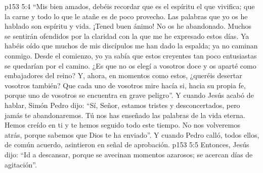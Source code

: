 \vs p153 5:4 “Mis bien amados, debéis recordar que es el espíritu el que vivifica; que la carne y todo lo que le atañe es de poco provecho. Las palabras que yo os he hablado son espíritu y vida. ¡Tened buen ánimo! No os he abandonado. Muchos se sentirán ofendidos por la claridad con la que me he expresado estos días. Ya habéis oído que muchos de mis discípulos me han dado la espalda; ya no caminan conmigo. Desde el comienzo, yo ya sabía que estos creyentes tan poco entusiastas se quedarían por el camino. ¿Es que no os elegí a vosotros doce y os aparté como embajadores del reino? Y, ahora, en momentos como estos, ¿queréis desertar vosotros también? Que cada uno de vosotros mire hacía si, hacia su propia fe, porque uno de vosotros se encuentra en grave peligro”. Y cuando Jesús acabó de hablar, Simón Pedro dijo: “Sí, Señor, estamos tristes y desconcertados, pero jamás te abandonaremos. Tú nos has enseñado las palabras de la vida eterna. Hemos creído en ti y te hemos seguido todo este tiempo. No nos volveremos atrás, porque sabemos que Dios te ha enviado”. Y cuando Pedro calló, todos ellos, de común acuerdo, asintieron en señal de aprobación.
\vs p153 5:5 Entonces, Jesús dijo: “Id a descansar, porque se avecinan momentos azarosos; se acercan días de agitación”.
